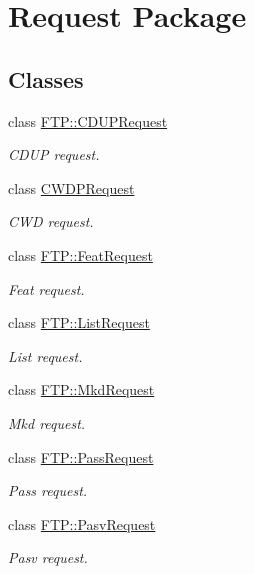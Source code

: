 \hypertarget{group__request}{\section{Request Package}
\label{group__request}
}
\subsection*{Classes}
\begin{DoxyCompactItemize}
\item 
class \hyperlink{classFTP_1_1CDUPRequest}{F\-T\-P\-::\-C\-D\-U\-P\-Request}
\begin{DoxyCompactList}\small\item\em C\-D\-U\-P request. \end{DoxyCompactList}\item 
class \hyperlink{classCWDPRequest}{C\-W\-D\-P\-Request}
\begin{DoxyCompactList}\small\item\em C\-W\-D request. \end{DoxyCompactList}\item 
class \hyperlink{classFTP_1_1FeatRequest}{F\-T\-P\-::\-Feat\-Request}
\begin{DoxyCompactList}\small\item\em Feat request. \end{DoxyCompactList}\item 
class \hyperlink{classFTP_1_1ListRequest}{F\-T\-P\-::\-List\-Request}
\begin{DoxyCompactList}\small\item\em List request. \end{DoxyCompactList}\item 
class \hyperlink{classFTP_1_1MkdRequest}{F\-T\-P\-::\-Mkd\-Request}
\begin{DoxyCompactList}\small\item\em Mkd request. \end{DoxyCompactList}\item 
class \hyperlink{classFTP_1_1PassRequest}{F\-T\-P\-::\-Pass\-Request}
\begin{DoxyCompactList}\small\item\em Pass request. \end{DoxyCompactList}\item 
class \hyperlink{classFTP_1_1PasvRequest}{F\-T\-P\-::\-Pasv\-Request}
\begin{DoxyCompactList}\small\item\em Pasv request. \end{DoxyCompactList}\item 

\end{DoxyCompactItemize}
